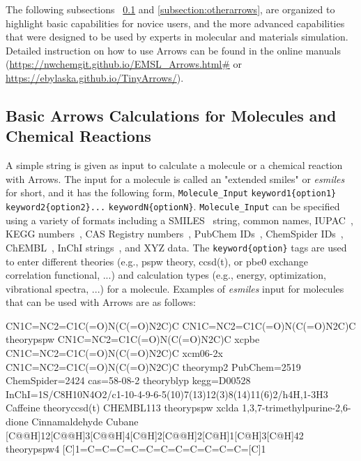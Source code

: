 \documentclass[runningheads,a4paper]{llncs}
\begin{document}
The following subsections ~\ref{subsection:moleculesreactions} and \ref{subsection:otherarrows}, are organized to highlight  basic capabilities for novice users, and the more advanced capabilities that were designed to be used by experts in molecular and materials simulation. Detailed instruction on how to use Arrows can be found in the online manuals (\url{https://nwchemgit.github.io/EMSL_Arrows.html#} or 
 \url{https://ebylaska.github.io/TinyArrows/}).

\subsection{Basic Arrows Calculations for Molecules and Chemical Reactions}
\label{subsection:moleculesreactions}

A simple string is given as input to calculate a molecule or a chemical reaction with Arrows.  The input for a molecule is called an "extended smiles" or \textit{esmiles} for short, and it has the following form, \verb|Molecule_Input| \verb|keyword1{option1}| \verb|keyword2{option2}...| \verb|keywordN{optionN}|.  \verb|Molecule_Input| can be specified using a variety of formats including a SMILES~\cite{weininger1988smiles,weininger1989smiles} string, common names, IUPAC~\cite{favre2013nomenclature}, KEGG numbers~\cite{kanehisa2000kegg}, CAS Registry numbers~\cite{weisgerber1997chemical}, PubChem IDs~\cite{kim2016pubchem}, ChemSpider IDs~\cite{williams2014royal,ayers2012chemspider}, ChEMBL~\cite{gaulton2017chembl}, InChI strings~\cite{heller2013inchi,heller2015inchi}, and XYZ data. The \verb|keyword{option}| tags are used to enter different theories (e.g., pspw theory, ccsd(t), or pbe0 exchange correlation functional, ...) and calculation types (e.g., energy, optimization, vibrational spectra, ...) for a molecule. Examples of \textit{esmiles} input for molecules that can be used with Arrows are as follows:
\newline

\small
\begin{center}
\begin{boxedverbatim}
CN1C=NC2=C1C(=O)N(C(=O)N2C)C
CN1C=NC2=C1C(=O)N(C(=O)N2C)C theory{pspw}
CN1C=NC2=C1C(=O)N(C(=O)N2C)C xc{pbe}
CN1C=NC2=C1C(=O)N(C(=O)N2C)C xc{m06-2x}
CN1C=NC2=C1C(=O)N(C(=O)N2C)C theory{mp2}
PubChem=2519
ChemSpider=2424
cas=58-08-2 theory{blyp} 
kegg=D00528
InChI=1S/C8H10N4O2/c1-10-4-9-6-5(10)7(13)12(3)8(14)11(6)2/h4H,1-3H3
Caffeine theory{ccsd(t)}
CHEMBL113 theory{pspw} xc{lda}
1,3,7-trimethylpurine-2,6-dione
Cinnamaldehyde
Cubane
[C@@H]12[C@@H]3[C@@H]4[C@H]2[C@@H]2[C@H]1[C@H]3[C@H]42 theory{pspw4}
[C]1=C=C=C=C=C=C=C=C=C=C=C=[C]1
\end{boxedverbatim}
\end{center}
\normalsize
\end{document}
